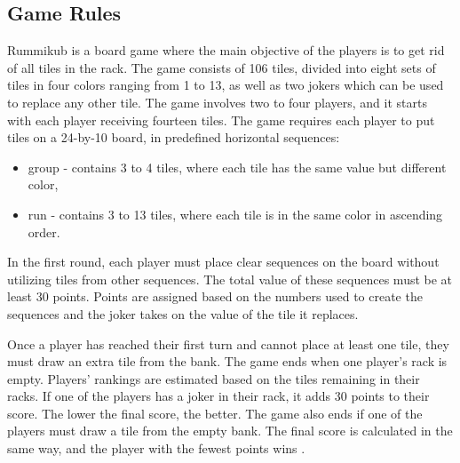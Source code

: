 \subsection{Game Rules}
Rummikub is a board game where the main objective of the players is to get rid of all tiles in the rack. The game consists of 106 tiles, divided into eight sets of tiles in four colors ranging from 1 to 13, as well as two jokers which can be used to replace any other tile. The game involves two to four players, and it starts with each player receiving fourteen tiles. The game requires each player to put tiles on a 24-by-10 board, in predefined horizontal sequences:
\begin{itemize}
	\item group - contains 3 to 4 tiles, where each tile has the same value but different color,
	\item run - contains 3 to 13 tiles, where each tile is in the same color in ascending order.
\end{itemize}
In the first round, each player must place clear sequences on the board without utilizing tiles from other sequences. The total value of these sequences must be at least 30 points. Points are assigned based on the numbers used to create the sequences and the joker takes on the value of the tile it replaces.

Once a player has reached their first turn and cannot place at least one tile, they must draw an extra tile from the bank.
The game ends when one player's rack is empty. Players' rankings are estimated based on the tiles remaining in their racks. If one of the players has a joker in their rack, it adds 30 points to their score. The lower the final score, the better.
The game also ends if one of the players must draw a tile from the empty bank. The final score is calculated in the same way, and the player with the fewest points wins \cite{rummikub_rules}.
